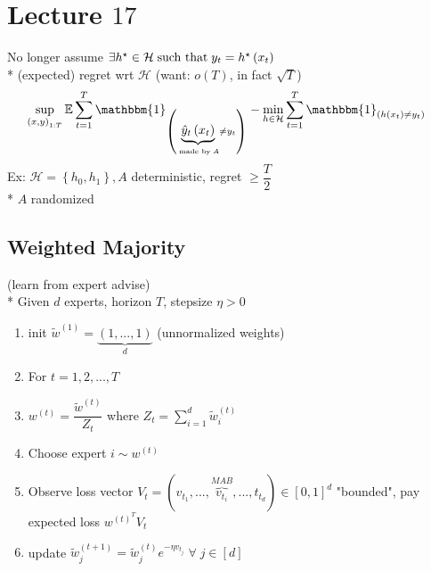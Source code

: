 \documentclass{article}
\begin{document}
\section{Lecture $17$} 
No longer assume $\exists h^\star  \in \mathcal{H} \text{\;such that\;} y_{t} = h^\star \left(x_{t}\right)$
\\* (expected) regret wrt $\mathcal{H}$ (want: $o\left(T\right) $, in fact $\sqrt{T}$)
\begin{align*}
&\displaystyle\sup_{\left(x, y\right)_{1:T}} \mathbb{E} \displaystyle\sum_{t=1}^{T} \mathbbm{1}_{\left(\underbrace{\hat{y}_{t}\left(x_{t}\right)}_{\text{\;made by\;} A} \neq  y_{t}\right)} - \displaystyle\min_{h \in \mathcal{H}} \displaystyle\sum_{t=1}^{T} \mathbbm{1}_{\left(h\left(x_{t}\right) \neq  y_{t}\right)}
\end{align*}
Ex: $\mathcal{H} = \left\{h_{0}, h_{1}\right\}, A $ deterministic, regret $\geq  \dfrac{T}{2}$
\\* $A $ randomized
\newline \newline

\subsection{Weighted Majority}
(learn from expert advise)
\\* Given $d $ experts, horizon $T $, stepsize $\eta > 0$
\begin{enumerate}
\item init $\tilde{w}^{\left(1\right)} = \underbrace{\left(1, ..., 1\right)}_{d}$ (unnormalized weights)
\item For $t  = 1, 2, ..., T $
\item $w^{\left(t\right)} = \dfrac{\tilde{w}^{\left(t\right)}}{Z_{t}}$ where $Z_{t} = \displaystyle\sum_{i=1}^{d} \tilde{w}_{i}^{\left(t\right)}$
\item Choose expert $i  \sim  w^{\left(t\right)}$
\item Observe loss vector $V_{t} = \left(v_{t_{1}} , ..., \overbrace{\boxed{v_{t_{i}}}}^{MAB} , ..., t_{t_{d}}\right) \in \left[0, 1\right]^{d}$ "bounded", pay expected loss $w^{\left(t\right)^{T}} V_{t}$
\item update $\tilde{w}_{j}^{\left(t+1\right)} = \tilde{w}_{j}^{\left(t\right)} e^{- \eta v_{t_{j}}} \;\forall\; j \in \left[d\right]$
\end{enumerate}
\end{document}
